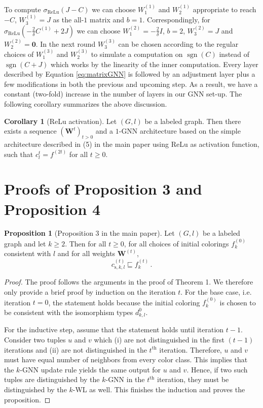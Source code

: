 \documentclass[letterpaper]{article}
\theoremstyle{definition}
\newtheorem{proposition}[theorem]{Proposition}
\newtheorem{corollary}[theorem]{Corollary}
\renewcommand{\vec}[1]{\mathbf{#1}}
\newcommand{\sgn}{\operatorname{sgn}}
\begin{document}
To compute $\sigma_{\operatorname{ReLu}}(J-C)$ we can choose $W^{(1)}_1$ and $W^{(1)}_2$ appropriate to reach $-C$, $W^{(1)}_3 = J$ as the all-$1$ matrix and $b=1$.
Correspondingly, for $\sigma_{\operatorname{ReLu}}(-\frac{2}{\delta}C^{(1)} +2J)$ we can choose $W^{(2)}_1 = -\frac{2}{\delta}I$, $b=2$, $W^{(2)}_3 = J$ and $W^{(2)}_2 = \vec 0$.
In the next round $W^{(3)}_3$ can be chosen according to the regular choices of $W^{(3)}_1$ and $W^{(3)}_2$ to simulate a computation on $\sgn{}(C)$ instead of $\sgn{}(C+J)$ which works by the linearity of the inner computation. Every layer described by Equation \eqref{eq:matrixGNN} is followed by an adjustment layer plus a few modifications in both the previous and upcoming step.
As a result, we have a constant (two-fold) increase
in the number of layers in our GNN set-up. The following corollary 
summarizes the above discussion.

\begin{corollary}[ReLu activation]
	Let $(G, l)$ be a labeled graph.
	Then there exists a sequence $(\mathbf{W}^t)_{ t > 0}$ and a $1$-GNN architecture based on the simple architecture described in (5) in the main paper using ReLu as activation function, such that $c^t_l=f^{(2t)}$ for all $t\geq 0$.
\end{corollary}



\section{Proofs of Proposition 3 and Proposition 4}

\begin{proposition}[Proposition 3 in the main paper]
	Let $(G, l)$ be a labeled graph and let $k\geq 2$. Then for all $t \ge 0$, for all choices of initial colorings $f_k^{(0)}$ consistent with $l$ and for all weights $\mathbf{W}^{(t)}$,
	\begin{equation*}\label{refine}
		c^{(t)}_{\text{s},k,l} \sqsubseteq f^{(t)}_{k}\,. 
\end{equation*}
\end{proposition}

\begin{proof}
	The proof follows the arguments in the proof of Theorem 1.
	We therefore only provide a brief proof by induction on the iteration $t$. 
	For the base case, i.e. iteration $t=0$, the statement holds because 
	the initial coloring $f_k^{(0)}$ is chosen to be consistent with the 
	isomorphism types $d^0_{k,l}$.
				
	For the inductive step, assume that the statement holds until iteration $t-1$.
	Consider two tuples $u$ and $v$ 
	which (i) are not distinguished in the first $(t-1)$ iterations 
	and (ii) are not distinguished in the $t^\text{th}$ iteration. 
	Therefore, $u$ and $v$ must have equal number of neighbors from 
	every color class. This implies that the $k$-GNN update rule yields the same output for $u$ and $v$.
	Hence, if two such tuples are distinguished by the $k$-GNN in the $t^\text{th}$ iteration,
	they must be distinguished by the $k$-WL as well. This finishes the induction and proves the proposition. 
\end{proof}
\end{document}
